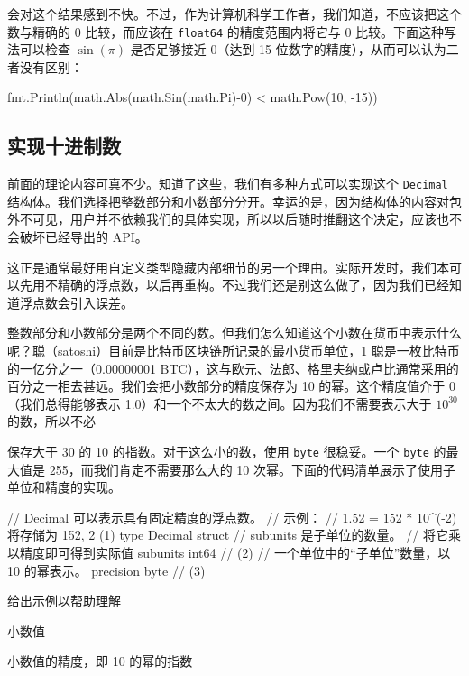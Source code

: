 会对这个结果感到不快。不过，作为计算机科学工作者，我们知道，不应该把这个数与精确的 0 比较，而应该在 \texttt{float64} 的精度范围内将它与 0 比较。下面这种写法可以检查 $\sin(\pi)$ 是否足够接近 0（达到 15 位数字的精度），从而可以认为二者没有区别：

\begin{gocode}[]
fmt.Println(math.Abs(math.Sin(math.Pi)-0) < math.Pow(10, -15))
\end{gocode}

\subsection{实现十进制数}

前面的理论内容可真不少。知道了这些，我们有多种方式可以实现这个 \texttt{Decimal} 结构体。我们选择把整数部分和小数部分分开。幸运的是，因为结构体的内容对包外不可见，用户并不依赖我们的具体实现，所以以后随时推翻这个决定，应该也不会破坏已经导出的 API。

这正是通常最好用自定义类型隐藏内部细节的另一个理由。实际开发时，我们本可以先用不精确的浮点数，以后再重构。不过我们还是别这么做了，因为我们已经知道浮点数会引入误差。

整数部分和小数部分是两个不同的数。但我们怎么知道这个小数在货币中表示什么呢？聪（satoshi）目前是比特币区块链所记录的最小货币单位，1 聪是一枚比特币的一亿分之一（0.00000001 BTC），这与欧元、法郎、格里夫纳或卢比通常采用的百分之一相去甚远。我们会把小数部分的精度保存为 10 的幂。这个精度值介于 0（我们总得能够表示 1.0）和一个不太大的数之间。因为我们不需要表示大于 $10^{30}$ 的数，所以不必

保存大于 30 的 10 的指数。对于这么小的数，使用 \texttt{byte} 很稳妥。一个 \texttt{byte} 的最大值是 255，而我们肯定不需要那么大的 10 次幂。下面的代码清单展示了使用子单位和精度的实现。

\begin{gocode}[title={代码清单 6.6 \texttt{decimal.go}：\texttt{Decimal} 结构体的实现}]
// Decimal 可以表示具有固定精度的浮点数。
// 示例：
// 1.52 = 152 * 10^(-2) 将存储为 {152, 2} (1)
type Decimal struct {
    // subunits 是子单位的数量。
    // 将它乘以精度即可得到实际值
    subunits int64 // (2)
    // 一个单位中的“子单位”数量，以 10 的幂表示。
    precision byte // (3)
}
\end{gocode}

\begin{codeannotations}
\item 给出示例以帮助理解
\item 小数值
\item 小数值的精度，即 10 的幂的指数
\end{codeannotations}

